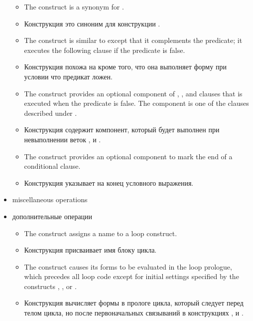 \begin{itemize}
\begin{itemize}
  \item The  construct is a synonym for .

  \item Конструкция  это синоним для конструкции .

  \item The  construct is similar to  except
    that it complements the predicate; it executes the following
    clause if the predicate is false.

  \item Конструкция  похожа на  кроме того, что
    она выполняет форму при условии что предикат ложен.

  \item The  construct provides an optional component of
    , , and  clauses that is executed
    when the predicate is false.  The component is one of the clauses
    described under .

  \item Конструкция  содержит компонент, который будет
    выполнен при невыполнении веток ,  и
    . 

  \item The  construct provides an optional component to mark
    the end of a conditional clause.

  \item Конструкция  указывает на конец условного выражения.
  \end{itemize}

  \item miscellaneous operations

  \item дополнительные операции

  \begin{itemize}
  \item The  construct assigns a name to a loop construct.


  \item Конструкция  присваивает имя блоку цикла.

  \item The  construct causes its forms to be evaluated
    in the loop prologue, which precedes all loop code except for
    initial settings specified by the constructs ,
    , or .

  \item Конструкция  вычисляет формы в прологе цикла,
    который следует перед телом цикла, но после первоначальных
    связываний в конструкциях ,  и .


\end{itemize}
\end{itemize}
